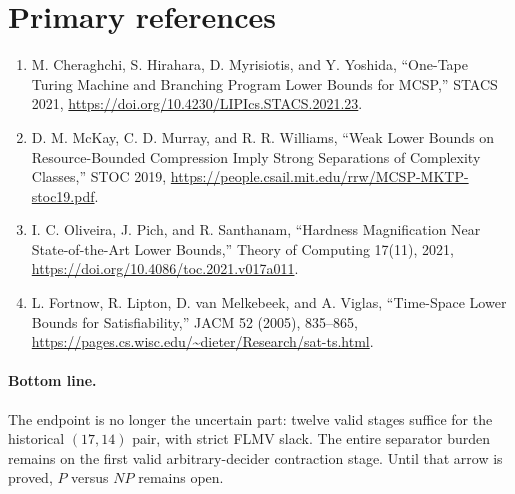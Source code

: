\documentclass[11pt]{article}
\begin{document}
\section{Primary references}
\begin{enumerate}[leftmargin=*]
  \item M. Cheraghchi, S. Hirahara, D. Myrisiotis, and Y. Yoshida,
  ``One-Tape Turing Machine and Branching Program Lower Bounds for MCSP,''
  STACS 2021, \url{https://doi.org/10.4230/LIPIcs.STACS.2021.23}.
  \item D. M. McKay, C. D. Murray, and R. R. Williams,
  ``Weak Lower Bounds on Resource-Bounded Compression Imply Strong Separations
  of Complexity Classes,'' STOC 2019,
  \url{https://people.csail.mit.edu/rrw/MCSP-MKTP-stoc19.pdf}.
  \item I. C. Oliveira, J. Pich, and R. Santhanam,
  ``Hardness Magnification Near State-of-the-Art Lower Bounds,'' Theory of
  Computing 17(11), 2021, \url{https://doi.org/10.4086/toc.2021.v017a011}.
  \item L. Fortnow, R. Lipton, D. van Melkebeek, and A. Viglas,
  ``Time-Space Lower Bounds for Satisfiability,'' JACM 52 (2005), 835--865,
  \url{https://pages.cs.wisc.edu/~dieter/Research/sat-ts.html}.
\end{enumerate}

\paragraph{Bottom line.}
The endpoint is no longer the uncertain part: twelve valid stages suffice for
the historical $(17,14)$ pair, with strict FLMV slack.  The entire separator
burden remains on the first valid arbitrary-decider contraction stage.  Until
that arrow is proved, $P$ versus $NP$ remains open.
\end{document}
